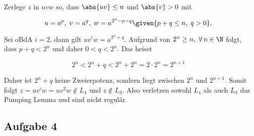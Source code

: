 \begin{enumerate}[a)]
  Zerlege $z$ in $uvw$ so, dass $\abs{uv} \leq n$ und $\abs{v} > 0$ mit

  \[  u = a^p, \; v = a^q, \; w = a^{2^{n} - p -q} \given{p+q \leq n, \; q > 0} . \]

  Sei oBdA $i=2$, dann gilt $uv^{i}w = a^{2^{n} + q}$. Aufgrund von $2^n \geq n, \; \forall \, n \in \N$ folgt, dass $p+q < 2^n$ und daher $0 < q < 2^n$. Das heisst

  \[  2^n < 2^n + q < 2^n + 2^n = 2 \cdot 2^n = 2^{n+1}  \]

  Daher ist $2^n + q$ keine Zweierpotenz, sondern liegt zwischen $2^n$ und $2^{n+1}$. Somit folgt $z = uv^{i}w = uv^{2}w \notin L_4$ und $z \notin L_3$. Also verletzen sowohl $L_4$ als auch $L_3$ das Pumping Lemma und sind nicht regulär.
  \end{enumerate}


\subsection*{Aufgabe 4}

